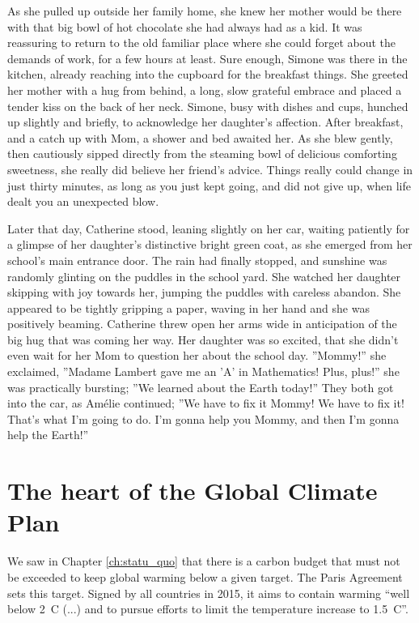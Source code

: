 \documentclass[a5paper,english,openany]{memoir}
\begin{document}
As she pulled up outside her family home, she knew her mother would be there with that big bowl of hot chocolate she had %
always had as a kid. It was reassuring to return to the old familiar place where she could forget about the demands of work, for a few hours at least. Sure enough, Simone was there in the kitchen, already reaching into the cupboard for the breakfast things. She greeted her mother with a hug from behind, a long, slow grateful embrace and placed a tender kiss on the back of her neck. Simone, busy with dishes and cups, hunched up slightly and briefly, to acknowledge her daughter's affection. After breakfast, and a catch up with Mom, %
a shower and bed awaited her. As she blew gently, then cautiously sipped directly from the steaming bowl of delicious comforting sweetness, she really did believe her friend's advice. Things really could change in just thirty minutes, as long as you just kept going, and did not give up, when life dealt you an unexpected blow.

Later that day, Catherine stood, leaning slightly on her car, waiting patiently for a glimpse of her daughter's distinctive bright green coat, as she emerged from her school's main entrance door. The rain had finally stopped, and sunshine was randomly glinting on the puddles in the school yard. She watched her daughter skipping with joy towards her, jumping the puddles with careless abandon. She appeared to be tightly gripping a paper, waving in her hand and she was positively beaming. Catherine threw open her arms wide in anticipation of the big hug that was coming her way. Her daughter was so excited, that she didn't even wait for her Mom %
to question her about the school day. ''Mommy!'' %
she exclaimed, ''Madame Lambert gave me an 'A' in Mathematics! Plus, plus!'' she was practically bursting; ''We learned about the Earth today!'' They both got into the car, as Amélie continued; ''We have to fix it Mommy! %
We have to fix it! That's what I'm going to do. I'm gonna help you Mommy, and then I'm gonna help the Earth!''

\chapter{The heart of the Global Climate Plan\label{ch:coeur}}

We saw in Chapter \ref{ch:statu_quo} that there is a carbon budget that must not be exceeded to keep global warming below a given target. The Paris Agreement sets this target. Signed by all countries in 2015, it aims to contain warming ``well below 2~\textdegree{}C (...) and to pursue efforts to limit the temperature increase to 1.5~\textdegree{}C''. \\
\end{document}
